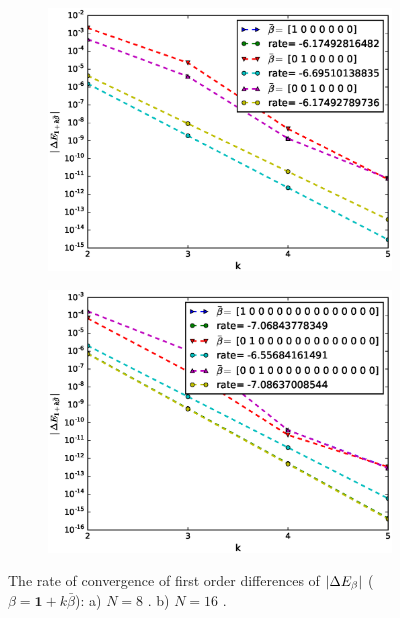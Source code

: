 \documentclass[11pt]{article}
\begin{document}
\begin{figure}[!h]
	\centering
	\begin{subfigure}{.5\textwidth}
		\centering
		\includegraphics[width=1\linewidth]{./figures/first_difference_1D_BS_richardson_4_8_no_middle.eps}
		\caption{}
		\label{fig:sub41_richardson}
	\end{subfigure}%
	\begin{subfigure}{.5\textwidth}
		\centering
		\includegraphics[width=1\linewidth]{./figures/first_difference_1D_BS_richardson_8_16_no_middle.eps}
		\caption{}
		\label{fig:sub42_richardson}
	\end{subfigure}%
	\caption{The rate of convergence of first order differences of $\left\lvert\Delta E_{\beta}\right\rvert$ ($\beta=\mathbf{1}+k \bar{\beta}$): a) $N=8$ . b) $N=16$ .}
	\label{fig:test4_richardson}
\end{figure}
\end{document}
